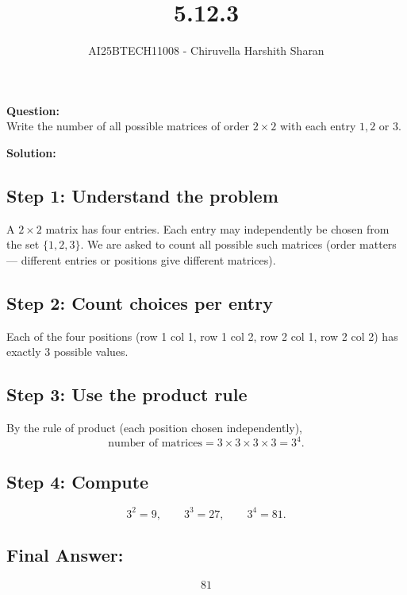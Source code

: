 \documentclass[journal]{IEEEtran}
\begin{document}

\vspace{2cm}

\title{5.12.3}
\author{AI25BTECH11008 - Chiruvella Harshith Sharan}
{\let\newpage\relax\maketitle}

\textbf{Question:} \\

Write the number of all possible matrices of order \(2\times 2\) with each entry \(1,2\) or \(3\).

\vspace{0.3cm}
\textbf{Solution:}

\subsection*{Step 1: Understand the problem}
A \(2\times2\) matrix has four entries. Each entry may independently be chosen from the set \(\{1,2,3\}\). We are asked to count all possible such matrices (order matters — different entries or positions give different matrices).

\subsection*{Step 2: Count choices per entry}
Each of the four positions (row 1 col 1, row 1 col 2, row 2 col 1, row 2 col 2) has exactly \(3\) possible values.

\subsection*{Step 3: Use the product rule}
By the rule of product (each position chosen independently),
\[
\text{number of matrices} = 3\times 3\times 3\times 3 = 3^4.
\]

\subsection*{Step 4: Compute}
\[
3^2 = 9,\qquad 3^3 = 27,\qquad 3^4 = 81.
\]

\subsection*{Final Answer:}
\[
\boxed{81}
\]
\end{document}
